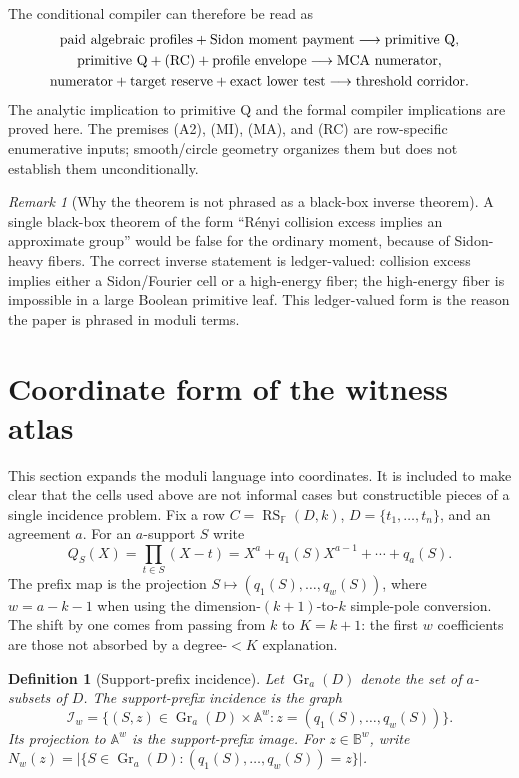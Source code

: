 \documentclass[12pt,a4paper]{amsart}
\numberwithin{equation}{section}
\newtheorem{definition}[definition]{Definition}
\theoremstyle{remark}
\newtheorem{remark}[remark]{Remark}
\DeclareMathOperator{\RS}{RS}
\DeclareMathOperator{\Gr}{Gr}
\newcommand{\F}{\mathbb F}
\newcommand{\B}{\mathbb B}
\newcommand{\A}{\mathbb A}
\newcommand{\Renyi}{R\'enyi}
\newcommand{\abs}[1]{\lvert #1\rvert}
\begin{document}
The conditional compiler can therefore be read as
\[
\begin{gathered}
\text{paid algebraic profiles}
+\text{Sidon moment payment}
\longrightarrow \text{primitive Q},\\
\text{primitive Q}+\textup{(RC)}
+\text{profile envelope}
\longrightarrow \text{MCA numerator},\\
\text{numerator}+\text{target reserve}+\text{exact lower test}
\longrightarrow \text{threshold corridor}.
\end{gathered}
\]
The analytic implication to primitive Q and the formal compiler implications
are proved here.  The premises \textup{(A2)}, \textup{(MI)},
\textup{(MA)}, and
\textup{(RC)} are row-specific enumerative inputs; smooth/circle geometry
organizes them but does not establish them unconditionally.

\begin{remark}[Why the theorem is not phrased as a black-box inverse theorem]
A single black-box theorem of the form ``\Renyi{} collision excess implies an approximate group'' would be false for the ordinary moment, because of Sidon-heavy fibers.  The correct inverse statement is ledger-valued: collision excess implies either a Sidon/Fourier cell or a high-energy fiber; the high-energy fiber is impossible in a large Boolean primitive leaf.  This ledger-valued form is the reason the paper is phrased in moduli terms.
\end{remark}



\section{Coordinate form of the witness atlas}\label{sec:coordinate-atlas}

This section expands the moduli language into coordinates.  It is included to make clear that the cells used above are not informal cases but constructible pieces of a single incidence problem.  Fix a row \(C=\RS_\F(D,k)\), \(D=\{t_1,\ldots,t_n\}\), and an agreement \(a\).  For an \(a\)-support \(S\) write
\[
        Q_S(X)=\prod_{t\in S}(X-t)
        =X^a+q_1(S)X^{a-1}+\cdots+q_a(S).
\]
The prefix map is the projection
\(S\mapsto(q_1(S),\ldots,q_w(S))\), where \(w=a-k-1\) when using the
dimension-\((k+1)\)-to-\(k\) simple-pole conversion.  The shift by one
comes from passing from \(k\) to \(K=k+1\): the first \(w\) coefficients
are those not absorbed by a degree-\(<K\) explanation.

\begin{definition}[Support-prefix incidence]\label{def:support-prefix-incidence}
Let \(\Gr_a(D)\) denote the set of \(a\)-subsets of \(D\).
The \emph{support-prefix incidence} is the graph
\[
 \mathcal I_w=\{(S,z)\in\Gr_a(D)\times\A^w:
       z=(q_1(S),\ldots,q_w(S))\}.
\]
Its projection to \(\A^w\) is the \emph{support-prefix image}.
For \(z\in\B^w\), write \(N_w(z)=\abs{\{S\in\Gr_a(D): (q_1(S),\ldots,q_w(S))=z\}}\).
\end{definition}
\end{document}
